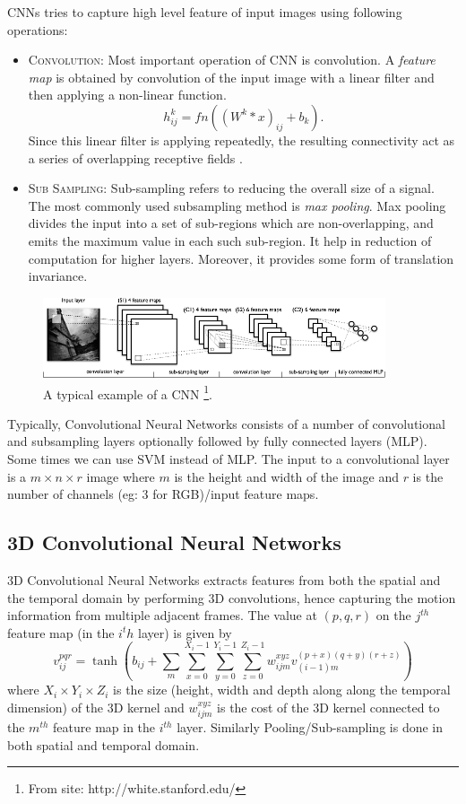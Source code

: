 \noindent CNNs tries to capture high level feature of input images using following operations:
\begin{itemize}
\item \textsc{Convolution}: Most important operation of CNN is convolution. A \textit{feature map} is obtained by convolution of the input image with a linear filter and then applying a non-linear function. 
$$h^k_{ij} = fn( (W^k * x)_{ij} + b_k ).$$
Since this linear filter is applying repeatedly, the resulting connectivity act as a series of overlapping receptive fields \cite{NIPS2012_4824}.
\item \textsc{Sub Sampling}: Sub-sampling refers to reducing the overall size of a signal. The most commonly used subsampling method is \textit{max pooling}. Max pooling divides the input into a set of sub-regions which are non-overlapping, and emits the maximum value in each such sub-region. It help in reduction of computation for higher layers. Moreover, it provides some form of translation invariance. 
\end{itemize}

\begin{figure}[!ht]
\centering
\includegraphics[width=0.9\textwidth]{./imgs/cnn1.png} 
\caption[An example of a convolutional neural network]{A typical example of a CNN \footnote{From site: http://white.stanford.edu/}. }
\label{fig:cnn}
\end{figure}

Typically, Convolutional Neural Networks consists of a number of convolutional and subsampling layers optionally followed by fully connected layers (MLP). Some times we can use SVM instead of MLP. The input to a convolutional layer is a $m \times n \times r$ image where $m$ is the height and width of the image and $r$ is the number of channels (eg: 3 for RGB)/input feature maps. 

\subsection{3D Convolutional Neural Networks}
3D Convolutional Neural Networks extracts features from both the spatial and the temporal domain by performing 3D convolutions, hence capturing the motion information from multiple adjacent frames.\cite{ji20133d} The value at $(p, q, r)$ on the $j^{th}$ feature map (in the $i^th$ layer) is given by
$$v^{pqr}_{ij} = \tanh(b_{ij}+\sum_{m} \sum_{x=0}^{X_i-1} \sum_{y=0}^{Y_i-1} \sum_{z=0}^{Z_i-1} w^{xyz}_{ijm} v^{(p+x)(q+y)(r+z)}_{(i−1)m}) $$
where $X_i \times Y_i \times Z_i$ is the size (height, width and depth along along the temporal
dimension) of the 3D kernel and $w^{xyz}_{ijm}$ is the cost of the 3D kernel connected to the $m^{th}$ feature map in the $i^{th}$ layer. Similarly Pooling/Sub-sampling is done in both spatial and temporal domain.

